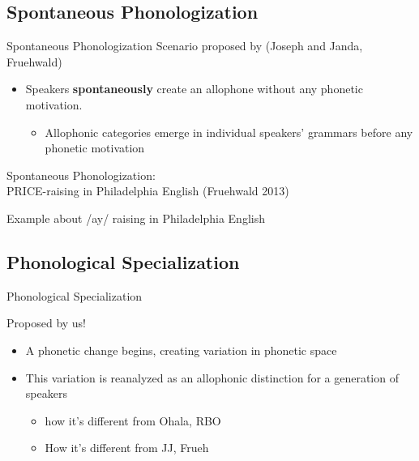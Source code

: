 \documentclass[hyperref={pdfpagelabels=false}]{beamer}
\begin{document}
\subsection{Spontaneous Phonologization}

\begin{frame}{Spontaneous Phonologization}
	Scenario proposed by (Joseph and Janda, Fruehwald) 
	
	\begin{itemize}
		\item Speakers \textbf{spontaneously} create an allophone without any phonetic motivation.  \\
		\begin{itemize}
			\item Allophonic categories emerge in individual speakers' grammars before any phonetic motivation
		\end{itemize}
	\end{itemize}
\end{frame}

\begin{frame}{Spontaneous Phonologization: \\ \small{PRICE-raising in Philadelphia English (Fruehwald 2013)}}

	Example about /ay/ raising in Philadelphia English
\end{frame}

\subsection{Phonological Specialization}

\begin{frame}{Phonological Specialization}

	Proposed by us!
	\begin{itemize}
		\item A phonetic change begins, creating variation in phonetic space
		\item This variation is reanalyzed as an allophonic distinction for a generation of speakers
		\begin{itemize}
				\item how it's different from Ohala, RBO
				\item How it's different from JJ, Frueh
		\end{itemize}
	\end{itemize}

\end{frame}
\end{document}
